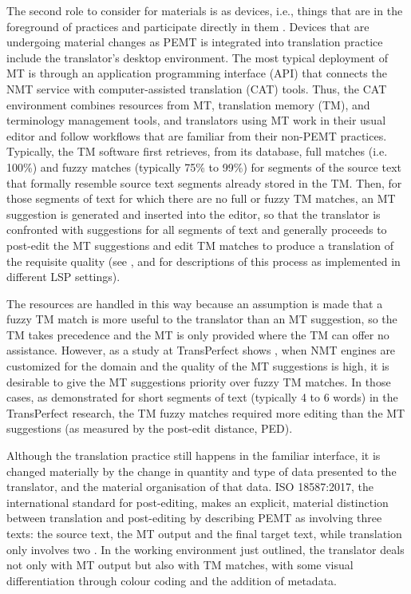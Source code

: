 \documentclass[output=paper,colorlinks,citecolor=brown]{langsci/langscibook}
\begin{document}
The second role to consider for materials is as devices, i.e., things that are in the foreground of practices and participate directly in them \citep{shove_matters_2017}. Devices that are undergoing material changes as PEMT is integrated into translation practice include the translator’s desktop environment. The most typical deployment of MT is through an application programming interface (API) that connects the NMT service with computer-assisted translation (CAT) tools. Thus, the CAT environment combines resources from MT, translation memory (TM), and terminology management tools, and translators using MT work in their usual editor and follow workflows that are familiar from their non-PEMT practices. Typically, the TM software first retrieves, from its database, full matches (i.e. 100\%) and fuzzy matches (typically 75\% to 99\%) for segments of the source text that formally resemble source text segments already stored in the TM. Then, for those segments of text for which there are no full or fuzzy TM matches, an MT suggestion is generated and inserted into the editor, so that the translator is confronted with suggestions for all segments of text and generally proceeds to post-edit the MT suggestions and edit TM matches to produce a translation of the requisite quality (see \citealt{zaretskaya_optimising_2019}, \citealt{premoli_mtpe_2019} and \citealt{nunziatini_machine_2019} for descriptions of this process as implemented in different LSP settings).

The resources are handled in this way because an assumption is made that a fuzzy TM match is more useful to the translator than an MT suggestion, so the TM takes precedence and the MT is only provided where the TM can offer no assistance. However, as a study at TransPerfect shows \citep{zaretskaya_raising_2019}, when NMT engines are customized for the domain and the quality of the MT suggestions is high, it is desirable to give the MT suggestions priority over fuzzy TM matches. In those cases, as demonstrated for short segments of text (typically 4 to 6 words) in the TransPerfect research, the TM fuzzy matches required more editing than the MT suggestions (as measured by the post-edit distance, PED). 

Although the translation practice still happens in the familiar interface, it is changed materially by the change in quantity and type of data presented to the translator, and the material organisation of that data. ISO 18587:2017, the international standard for post-editing, makes an explicit, material distinction between translation and post-editing by describing PEMT as involving three texts: the source text, the MT output and the final target text, while translation only involves two \citep[5]{british_standards_institution_iso_2017}. In the working environment just outlined, the translator deals not only with MT output but also with TM matches, with some visual differentiation through colour coding and the addition of metadata. 
\end{document}
